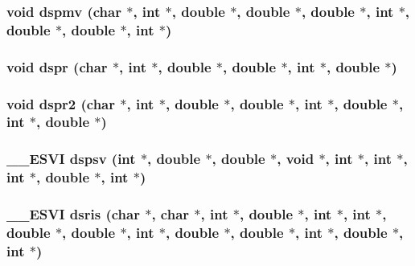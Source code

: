 \subsubsection{\setlength{\rightskip}{0pt plus 5cm}void dspmv (char $\ast$, int $\ast$, double $\ast$, double $\ast$, double $\ast$, int $\ast$, double $\ast$, double $\ast$, int $\ast$)}\label{essl_8h_e52688ccb54d1cd31920f61c6cc97a8e}


\subsubsection{\setlength{\rightskip}{0pt plus 5cm}void dspr (char $\ast$, int $\ast$, double $\ast$, double $\ast$, int $\ast$, double $\ast$)}\label{essl_8h_b087ab178b5a1f5378b3ec69c0611e29}


\subsubsection{\setlength{\rightskip}{0pt plus 5cm}void dspr2 (char $\ast$, int $\ast$, double $\ast$, double $\ast$, int $\ast$, double $\ast$, int $\ast$, double $\ast$)}\label{essl_8h_a4e8900a08bfc185f835e20d45c39358}


\subsubsection{\setlength{\rightskip}{0pt plus 5cm}\_\-\_\-ESVI dspsv (int $\ast$, double $\ast$, double $\ast$, void $\ast$, int $\ast$, int $\ast$, int $\ast$, double $\ast$, int $\ast$)}\label{essl_8h_51ab76bbfc509b574665aa7dead925b6}


\subsubsection{\setlength{\rightskip}{0pt plus 5cm}\_\-\_\-ESVI dsris (char $\ast$, char $\ast$, int $\ast$, double $\ast$, int $\ast$, int $\ast$, double $\ast$, double $\ast$, int $\ast$, double $\ast$, double $\ast$, int $\ast$, double $\ast$, int $\ast$)}\label{essl_8h_bf40573657cbfdc69d35a12722b8d6cd}



